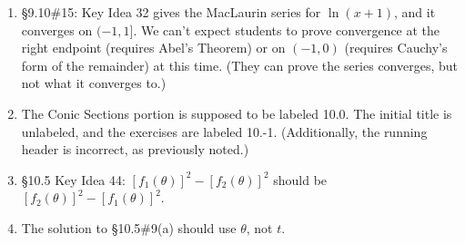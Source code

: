 \documentclass{amsart}
\begin{document}
\begin{enumerate}
\item \S9.10\#15: Key Idea 32 gives the MacLaurin series for $\ln(x+1)$, and it converges on $(-1,1]$.  We can't expect students to prove convergence at the right endpoint (requires Abel's Theorem) or on $(-1,0)$ (requires Cauchy's form of the remainder) at this time.  (They can prove the series converges, but not what it converges to.)
\item The Conic Sections portion is supposed to be labeled 10.0.  The initial title is unlabeled, and the exercises are labeled 10.-1.  (Additionally, the running header is incorrect, as previously noted.)
\item \S10.5 Key Idea 44: $[f_1(\theta)]^2 - [f_2(\theta)]^2$ should be $[f_2(\theta)]^2 - [f_1(\theta)]^2$.
\item The solution to \S10.5\#9(a) should use $\theta$, not $t$.
\label{2017-01IIplus}
\end{enumerate}

\end{document}
